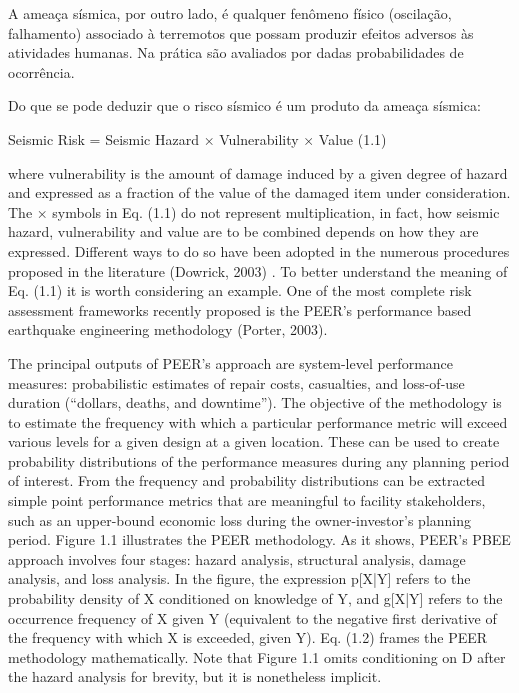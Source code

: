 A ameaça sísmica, por outro lado, é qualquer fenômeno físico (oscilação, falhamento) associado à terremotos que possam
produzir efeitos adversos às atividades humanas. Na prática são avaliados por dadas probabilidades de ocorrência.

Do que se pode deduzir que o risco sísmico é um produto da ameaça sísmica:

Seismic Risk = Seismic Hazard × Vulnerability × Value (1.1)

where vulnerability is the amount of damage induced by a given degree of hazard and expressed as a fraction of the value of the
damaged item under consideration. The × symbols in Eq. (1.1) do not represent multiplication, in fact, how seismic hazard,
vulnerability and value are to be combined depends on how they are expressed. Different ways to do so have been adopted in the
numerous procedures proposed in the literature (Dowrick, 2003) . To better understand the meaning of Eq. (1.1) it is worth
considering an example. One of the most complete risk assessment frameworks recently proposed is the PEER’s performance based
earthquake engineering methodology (Porter, 2003).

The principal outputs of PEER’s approach are system-level performance measures: probabilistic estimates of repair costs,
casualties, and loss-of-use duration (“dollars, deaths, and downtime”). The objective of the methodology is to estimate 
the frequency with which a particular performance metric will exceed various levels for a given design at a given
location. These can be used to create probability distributions of the
performance measures during any planning period of interest. From the frequency and probability distributions can be
extracted simple point performance metrics that are meaningful to facility stakeholders, such as an upper-bound economic loss during the owner-investor’s planning period. Figure 1.1 illustrates the PEER methodology. As it shows, PEER’s PBEE approach involves four stages: hazard analysis, structural analysis, damage analysis, and loss analysis. In the figure, the expression p[X|Y] refers to the probability density of X conditioned on knowledge of Y, and g[X|Y] refers to the occurrence frequency of X given Y (equivalent to the negative first derivative of the frequency with which X is exceeded, given Y). Eq. (1.2) frames the PEER methodology mathematically. Note that Figure 1.1 omits conditioning on D after the hazard analysis for brevity, but it is nonetheless implicit.


